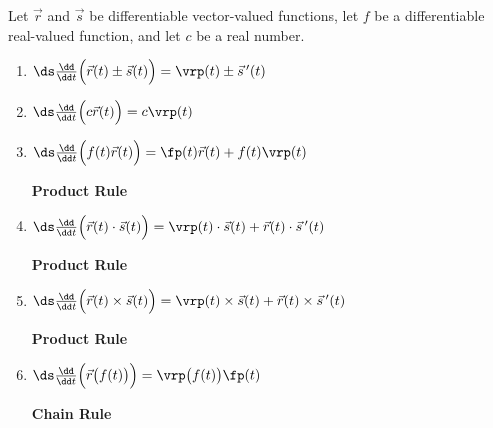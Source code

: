 \begin{theorem}\label{thm:vvf_deriv_prop}
Let $\vec r$ and $\vec s$ be differentiable vector-valued functions, let $f$ be a differentiable real-valued function, and let $c$ be a real number.
\begin{enumerate}
	\item $\ds \frac{\dd}{\dd t}\Bigl(\vec r(t) \pm \vec s(t)\Bigr) = \vrp(t) \pm \vec s\,'(t)$
	\item $\ds \frac{\dd}{\dd t}\Bigl(c\vec r(t)\Bigr) = c\vrp(t)$
	\item \parbox{200pt}{$\ds \frac{\dd}{\dd t}\Bigl(f(t)\vec r(t)\Bigr) = \fp(t)\vec r(t) + f(t)\vrp(t)$} \textbf{Product Rule}
	\item \parbox{200pt}{$\ds \frac{\dd}{\dd t}\Bigl(\vec r(t)\cdot \vec s(t) \Bigr) = \vrp(t)\cdot \vec s(t) + \vec r(t)\cdot \vec s\,'(t)$} \textbf{Product Rule}
	\item\label{crossprodrule} \parbox{200pt}{$\ds \frac{\dd}{\dd t}\Bigl(\vec r(t)\times \vec s(t) \Bigr) = \vrp(t)\times \vec s(t) + \vec r(t)\times \vec s\,'(t)$} \textbf{Product Rule}
%
	\item \parbox{200pt}{$\ds \frac{\dd}{\dd t}\Bigl(\vec r\bigl(f(t)\bigr)\Bigr) = \vrp\bigl(f(t)\bigr)\fp(t)$}  \textbf{Chain Rule}
\end{enumerate}
\end{theorem}

